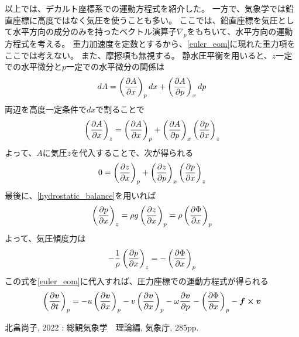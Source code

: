 \documentclass[a4paper,11pt,platex]{jsarticle}
\numberwithin{equation}{section}
\newcommand{\spartial}[2]{{\partial #1 \over \partial #2}}
\begin{document}
以上では、デカルト座標系での運動方程式を紹介した。
一方で、気象学では鉛直座標に高度ではなく気圧を使うことも多い。
ここでは、鉛直座標を気圧として水平方向の成分のみを持ったベクトル演算子$\nabla_p$をもちいて、水平方向の運動方程式を考える。
重力加速度を定数とするから、\autoref{euler_eom}に現れた重力項をここでは考えない。
また、摩擦項も無視する。
静水圧平衡を用いると、$z$一定での水平微分と$p$一定での水平微分の関係は
\begin{equation}
    dA = \left(\spartial{A}{x}\right)_p dx + \left(\spartial{A}{p}\right)_x dp
\end{equation}
両辺を高度一定条件で$dx$で割ることで
\begin{equation}
    \label{A_z_p_conversion}
    \left(\spartial{A}{x}\right)_z = \left(\spartial{A}{x}\right)_p + \left(\spartial{A}{p}\right)_x \left(\spartial{p}{x}\right)_z
\end{equation}
よって、$A$に気圧$z$を代入することで、次が得られる
\begin{equation}
    0 = \left(\spartial{z}{x}\right)_p + \left(\spartial{z}{p}\right)_x \left(\spartial{p}{x}\right)_z
\end{equation}
最後に、\autoref{hydrostatic_balance}を用いれば
\begin{equation}
    \left(\spartial{p}{x}\right)_z = \rho g \left(\spartial{z}{x}\right)_p = \rho \left(\spartial{\Phi}{x}\right)_p
\end{equation}
よって、気圧傾度力は
\begin{equation}
    -{1 \over \rho}\left(\spartial{p}{x}\right)_z = -\left(\spartial{\Phi}{x}\right)_p
\end{equation}
この式を\autoref{euler_eom}に代入すれば、圧力座標での運動方程式が得られる
\begin{equation}
    \left(\spartial{\vb*{v}}{t}\right)_p = -u\left(\spartial{\vb*{v}}{x}\right)_p - v\left(\spartial{\vb*{v}}{x}\right)_p - \omega\spartial{\vb*{v}}{p} - \left(\spartial{\Phi}{x}\right)_p - \vb*{f} \cross \vb*{v}
\end{equation}










\clearpage

\begin{thebibliography}{100}
    \item 北畠尚子, 2022 : 総観気象学　理論編, 気象庁, 285pp.
\end{thebibliography}
\end{document}
